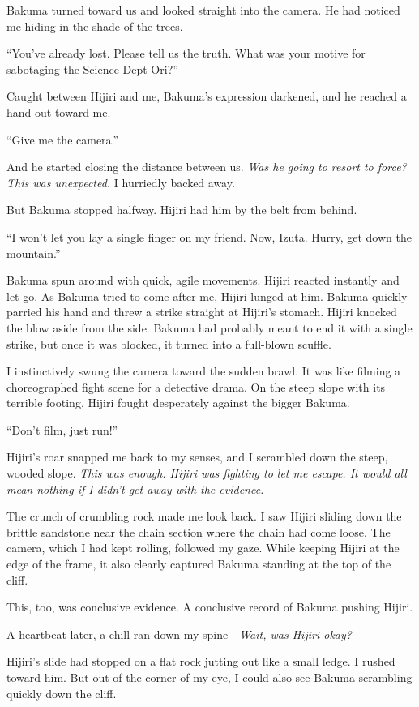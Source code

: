 \documentclass[
    a4paper,
    12pt,
    twoside,
    openany,
    UTF8,
    fontset=windows
]{ctexbook}
\begin{document}
Bakuma turned toward us and looked straight into the camera. He had noticed me hiding in the shade of the trees.

``You've already lost. Please tell us the truth. What was your motive for sabotaging the Science Dept Ori?''

Caught between Hijiri and me, Bakuma's expression darkened, and he reached a hand out toward me.

``Give me the camera.''

And he started closing the distance between us. \textit{Was he going to resort to force? This was unexpected.} I hurriedly backed away.

But Bakuma stopped halfway. Hijiri had him by the belt from behind.

``I won't let you lay a single finger on my friend. Now, Izuta. Hurry, get down the mountain.''

Bakuma spun around with quick, agile movements. Hijiri reacted instantly and let go. As Bakuma tried to come after me, Hijiri lunged at him. Bakuma quickly parried his hand and threw a strike straight at Hijiri's stomach. Hijiri knocked the blow aside from the side. Bakuma had probably meant to end it with a single strike, but once it was blocked, it turned into a full-blown scuffle.

I instinctively swung the camera toward the sudden brawl. It was like filming a choreographed fight scene for a detective drama. On the steep slope with its terrible footing, Hijiri fought desperately against the bigger Bakuma.

``Don't film, just run!''

Hijiri's roar snapped me back to my senses, and I scrambled down the steep, wooded slope. \textit{This was enough. Hijiri was fighting to let me escape. It would all mean nothing if I didn't get away with the evidence.}

The crunch of crumbling rock made me look back. I saw Hijiri sliding down the brittle sandstone near the chain section where the chain had come loose. The camera, which I had kept rolling, followed my gaze. While keeping Hijiri at the edge of the frame, it also clearly captured Bakuma standing at the top of the cliff.

This, too, was conclusive evidence. A conclusive record of Bakuma pushing Hijiri.

A heartbeat later, a chill ran down my spine---\textit{Wait, was Hijiri okay?}

Hijiri's slide had stopped on a flat rock jutting out like a small ledge. I rushed toward him. But out of the corner of my eye, I could also see Bakuma scrambling quickly down the cliff.
\end{document}
